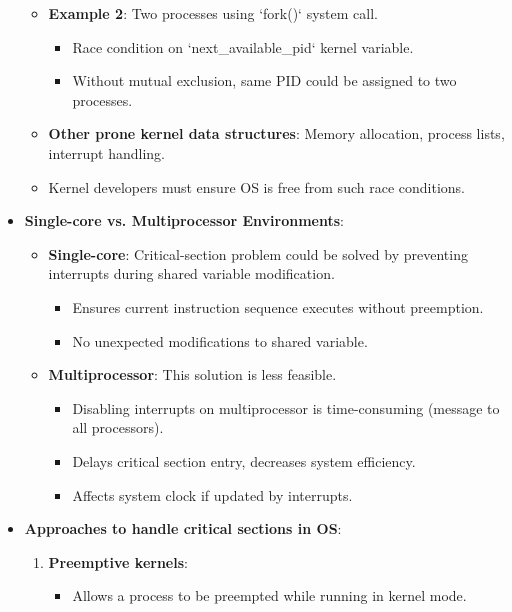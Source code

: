 \begin{itemize}
\begin{itemize}
\begin{itemize}
        \end{itemize}
        \item \textbf{Example 2}: Two processes using `fork()` system call.
        \begin{itemize}
            \item Race condition on `next\_available\_pid` kernel variable.
            \item Without mutual exclusion, same PID could be assigned to two processes.
        \end{itemize}
        \item \textbf{Other prone kernel data structures}: Memory allocation, process lists, interrupt handling.
        \item Kernel developers must ensure OS is free from such race conditions.
    \end{itemize}
    \item \textbf{Single-core vs. Multiprocessor Environments}:
    \begin{itemize}
        \item \textbf{Single-core}: Critical-section problem could be solved by preventing interrupts during shared variable modification.
        \begin{itemize}
            \item Ensures current instruction sequence executes without preemption.
            \item No unexpected modifications to shared variable.
        \end{itemize}
        \item \textbf{Multiprocessor}: This solution is less feasible.
        \begin{itemize}
            \item Disabling interrupts on multiprocessor is time-consuming (message to all processors).
            \item Delays critical section entry, decreases system efficiency.
            \item Affects system clock if updated by interrupts.
        \end{itemize}
    \end{itemize}
    \item \textbf{Approaches to handle critical sections in OS}:
    \begin{enumerate}
        \item \textbf{Preemptive kernels}:
        \begin{itemize}
            \item Allows a process to be preempted while running in kernel mode.

\end{itemize}
\end{enumerate}
\end{itemize}
